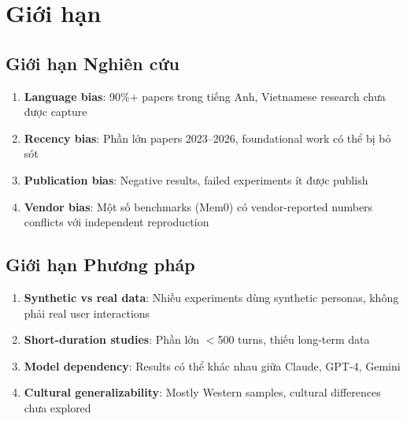 \section{Giới hạn}

\subsection{Giới hạn Nghiên cứu}

\begin{enumerate}
    \item \textbf{Language bias}: 90\%+ papers trong tiếng Anh, Vietnamese research chưa được capture
    \item \textbf{Recency bias}: Phần lớn papers 2023--2026, foundational work có thể bị bỏ sót
    \item \textbf{Publication bias}: Negative results, failed experiments ít được publish
    \item \textbf{Vendor bias}: Một số benchmarks (Mem0) có vendor-reported numbers conflicts với independent reproduction
\end{enumerate}

\subsection{Giới hạn Phương pháp}

\begin{enumerate}
    \item \textbf{Synthetic vs real data}: Nhiều experiments dùng synthetic personas, không phải real user interactions
    \item \textbf{Short-duration studies}: Phần lớn $<$500 turns, thiếu long-term data
    \item \textbf{Model dependency}: Results có thể khác nhau giữa Claude, GPT-4, Gemini
    \item \textbf{Cultural generalizability}: Mostly Western samples, cultural differences chưa explored
\end{enumerate}

